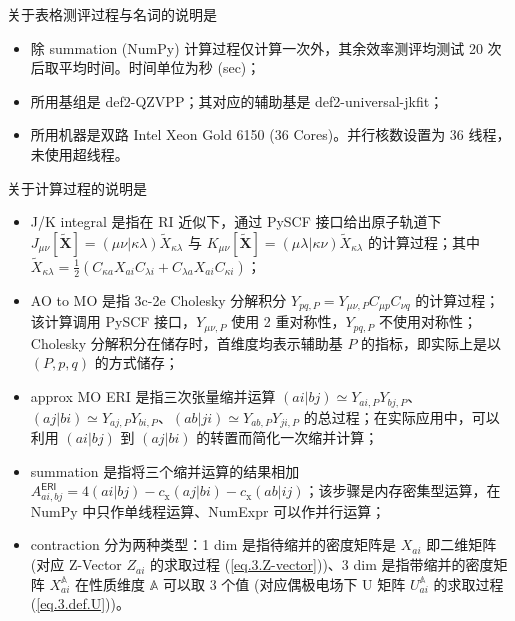 \begin{table}[h]
  \raggedright
   关于表格测评过程与名词的说明是
  \begin{itemize}[nosep]
    \item 除 summation (NumPy) 计算过程仅计算一次外，其余效率测评均测试 20 次后取平均时间。时间单位为秒 (sec)；
    \item 所用基组是 def2-QZVPP；其对应的辅助基是 def2-universal-jkfit；
    \item 所用机器是双路 Intel Xeon Gold 6150 (36 Cores)。并行核数设置为 36 线程，未使用超线程。
  \end{itemize}
   关于计算过程的说明是
  \begin{itemize}[nosep]
    \item J/K integral 是指在 RI 近似下，通过 PySCF 接口给出原子轨道下 $J_{\mu \nu} [\tilde{\mathbf{X}}] = (\mu \nu | \kappa \lambda) \tilde X_{\kappa \lambda}$ 与 $K_{\mu \nu} [\tilde{\mathbf{X}}] = (\mu \lambda | \kappa \nu) \tilde X_{\kappa \lambda}$ 的计算过程；其中 $\tilde{X}_{\kappa \lambda} = \frac{1}{2} (C_{\kappa a} X_{ai} C_{\lambda i} + C_{\lambda a} X_{ai} C_{\kappa i})$；
    \item AO to MO 是指 3c-2e Cholesky 分解积分 $Y_{pq, P} = Y_{\mu \nu, P} C_{\mu p} C_{\nu q}$ 的计算过程；该计算调用 PySCF 接口，$Y_{\mu \nu, P}$ 使用 2 重对称性，$Y_{pq, P}$ 不使用对称性；Cholesky 分解积分在储存时，首维度均表示辅助基 $P$ 的指标，即实际上是以 $(P, p, q)$ 的方式储存；
    \item approx MO ERI 是指三次张量缩并运算 $(ai|bj) \simeq Y_{ai, P} Y_{bj, P}$、$(aj|bi) \simeq Y_{aj, P} Y_{bi, P}$、$(ab|ji) \simeq Y_{ab, P} Y_{ji, P}$ 的总过程；在实际应用中，可以利用 $(ai|bj)$ 到 $(aj|bi)$ 的转置而简化一次缩并计算；
    \item summation 是指将三个缩并运算的结果相加 $A_{ai, bj}^\textsf{ERI} = 4 (ai | bj) - c_\mathrm{x} (aj | bi) - c_\mathrm{x} (ab | ij)$；该步骤是内存密集型运算，在 NumPy 中只作单线程运算、NumExpr 可以作并行运算；
    \item contraction 分为两种类型：1 dim 是指待缩并的密度矩阵是 $X_{ai}$ 即二维矩阵 (对应 Z-Vector $Z_{ai}$ 的求取过程 (\ref{eq.3.Z-vector}))、3 dim 是指带缩并的密度矩阵 $X_{ai}^{\mathbb{A}}$ 在性质维度 $\mathbb{A}$ 可以取 3 个值 (对应偶极电场下 U 矩阵 $U_{ai}^{\mathbb{A}}$ 的求取过程(\ref{eq.3.def.U}))。
  \end{itemize}
\end{table}

